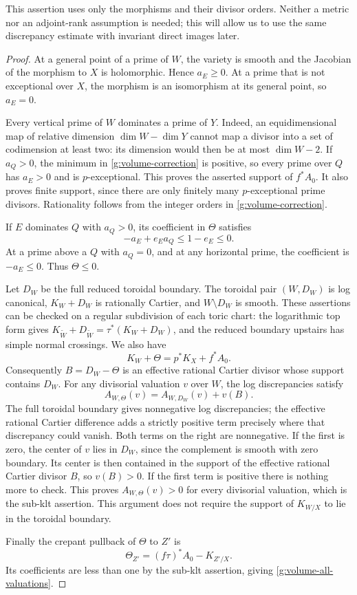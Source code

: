 This assertion uses only the morphisms and their divisor orders.
Neither a metric nor an adjoint-rank assumption is needed; this will
allow us to use the same discrepancy estimate with invariant direct
images later.

\begin{proof}
At a general point of a prime of $W$, the variety is smooth and the
Jacobian of the morphism to $X$ is holomorphic.  Hence $a_E\geq0$.
At a prime that is not exceptional over $X$, the morphism is an
isomorphism at its general point, so $a_E=0$.

Every vertical prime of $W$ dominates a prime of $Y$.  Indeed, an
equidimensional map of relative dimension $\dim W-\dim Y$ cannot map a
divisor into a set of codimension at least two: its dimension would
then be at most $\dim W-2$.  If $a_Q>0$, the minimum in
\eqref{g:volume-correction} is positive, so every prime over $Q$ has
$a_E>0$ and is $p$-exceptional.  This proves the asserted support of
$f^*A_0$.  It also proves finite support, since there are only finitely
many $p$-exceptional prime divisors.  Rationality follows from the
integer orders in \eqref{g:volume-correction}.

If $E$ dominates $Q$ with $a_Q>0$, its coefficient in $\Theta$
satisfies
\[
 -a_E+e_Ea_Q\leq 1-e_E\leq0.
\]
At a prime above a $Q$ with $a_Q=0$, and at any horizontal prime,
the coefficient is $-a_E\leq0$.  Thus $\Theta\leq0$.

Let $D_W$ be the full reduced toroidal boundary.  The toroidal pair
$(W,D_W)$ is log canonical, $K_W+D_W$ is rationally Cartier, and
$W\setminus D_W$ is smooth.  These assertions can be checked on a
regular subdivision of each toric chart: the logarithmic top form
gives
$K_{\widetilde W}+D_{\widetilde W}=\tau^*(K_W+D_W)$,
and the reduced boundary upstairs has simple normal crossings.
We also have
\[
 K_W+\Theta=p^*K_X+f^*A_0.
\]
Consequently $B=D_W-\Theta$ is an effective rational Cartier divisor
whose support contains $D_W$.  For any divisorial valuation $v$ over
$W$, the log discrepancies satisfy
\begin{equation}\label{g:volume-discrepancy-comparison}
 A_{W,\Theta}(v)=A_{W,D_W}(v)+v(B).
\end{equation}
The full toroidal boundary gives nonnegative log discrepancies;
the effective rational Cartier difference adds a strictly positive term precisely
where that discrepancy could vanish. Both terms on the right are nonnegative.  If the first is zero, the
center of $v$ lies in $D_W$, since the complement is smooth with zero
boundary.  Its center is then contained in the support of the
effective rational Cartier divisor $B$, so $v(B)>0$.  If the first
term is positive there is nothing more to check.  This proves
$A_{W,\Theta}(v)>0$ for every divisorial valuation, which is the
sub-klt assertion.  This argument does not require the support of
$K_{W/X}$ to lie in the toroidal boundary.

Finally the crepant pullback of $\Theta$ to $Z'$ is
\[
 \Theta_{Z'}=(f\tau)^*A_0-K_{Z'/X}.
\]
Its coefficients are less than one by the sub-klt assertion, giving
\eqref{g:volume-all-valuations}.
\end{proof}

